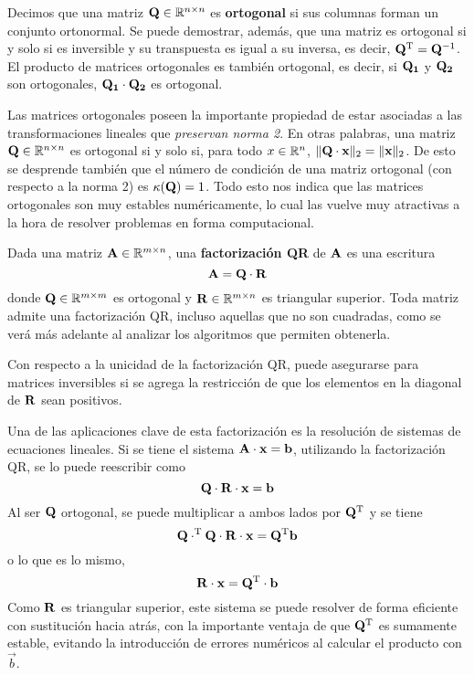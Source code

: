 Decimos que una matriz $\mathbf{Q} \in \mathbb{R}^{n \times n}$ es \textbf{ortogonal}
si sus columnas forman un conjunto ortonormal. Se puede demostrar, además, que
una matriz es ortogonal si y solo si es inversible y su transpuesta es igual a
su inversa, es decir, $\mathbf{Q}^{\mathrm{T}} = \mathbf{Q}^{-1}$. El producto de matrices
ortogonales es también ortogonal, es decir, si $\mathbf{Q_1}$ y $\mathbf{Q_2}$ son
ortogonales, $\mathbf{Q_1} \cdot \mathbf{Q_2}$ es ortogonal.

Las matrices ortogonales poseen la importante propiedad de estar asociadas a
las
transformaciones lineales que \emph{preservan norma 2}. En otras palabras, una
matriz $\mathbf{Q} \in \mathbb{R}^{n \times n}$ es ortogonal si y solo si, para todo
$x \in \mathbb{R}^n$, $\lVert \mathbf{Q} \cdot \mathbf{x} \rVert_2 =
\lVert \mathbf{x} \rVert_2$.
De esto se desprende también que el número de condición de una matriz
ortogonal (con respecto a la norma 2) es $\kappa(\mathbf{Q}) = 1$. Todo esto nos
indica que las matrices ortogonales son muy estables numéricamente, lo cual
las vuelve muy atractivas a la hora de resolver problemas en forma
computacional.

Dada una matriz $\mathbf{A} \in \mathbb{R}^{m \times n}$, una
\textbf{factorización QR} de $\mathbf{A}$ es una escritura
\[ \mathbf{A} = \mathbf{Q} \cdot \mathbf{R} \]
donde $\mathbf{Q} \in \mathbb{R}^{m \times m}$ es ortogonal y $\mathbf{R} \in \mathbb{R}^{m
\times n}$ es triangular superior. Toda matriz admite una factorización QR,
incluso aquellas que no son cuadradas, como se verá más adelante al analizar
los algoritmos que permiten obtenerla.

Con respecto a la unicidad de la factorización QR, puede asegurarse para
matrices inversibles si se agrega la restricción de que los elementos
en la diagonal de $\mathbf{R}$ sean positivos.

Una de las aplicaciones clave de esta factorización es la resolución
de sistemas de ecuaciones lineales. Si se tiene el sistema
$\mathbf{A} \cdot \mathbf{x} = \mathbf{b}$,
utilizando la factorización QR, se lo puede reescribir como
\[\mathbf{Q} \cdot \mathbf{R} \cdot \mathbf{x} = \mathbf{b}\]
Al ser $\mathbf{Q}$ ortogonal, se puede multiplicar
a ambos lados por $\mathbf{Q}^{\mathrm{T}}$ y se tiene
\[\mathbf{Q} \cdot ^{\mathrm{T}} \mathbf{Q} \cdot \mathbf{R} \cdot \mathbf{x}
    = \mathbf{Q}^{\mathrm{T}} \mathbf{b}\]
o lo que es lo mismo,
\[\mathbf{R} \cdot \mathbf{x} = \mathbf{Q}^{\mathrm{T}} \cdot \mathbf{b}\]
Como $\mathbf{R}$ es triangular superior, este sistema se puede resolver de forma
eficiente con sustitución hacia atrás, con la importante ventaja de que
$\mathbf{Q}^{\mathrm{T}}$ es sumamente estable, evitando la introducción de errores
numéricos al calcular el producto con $\vec{b}$.

